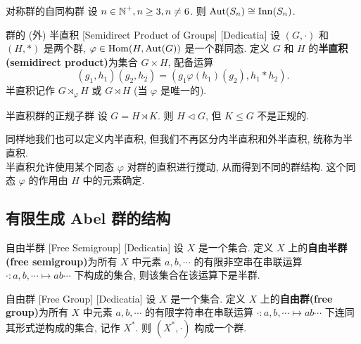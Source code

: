         \begin{ppt}
            {对称群的自同构群}
            设 \(n\in\operatorname{\mathbb{N}}^+, n\geq 3, n\neq 6\). 则 \(\operatorname{Aut}(S_n)\cong\operatorname{Inn}(S_n)\). 
        \end{ppt}

        \begin{dfn}
            {群的 (外) 半直积}
            [Semidirect Product of Groups]
            [Dedicatia]
            设 \((G,\cdot)\) 和 \((H,*)\) 是两个群, \(\varphi\in\operatorname{Hom}(H,\operatorname{Aut}(G))\) 是一个群同态. 定义 \(G\) 和 \(H\) 的\textbf{半直积(semidirect product)}为集合 \(G\times H\), 配备运算
            \[(g_1,h_1)(g_2,h_2)=(g_1\varphi(h_1)(g_2), h_1*h_2).\]
            半直积记作 \(G\rtimes_\varphi H\) 或 \(G\rtimes H\) (当 \(\varphi\) 是唯一的).
        \end{dfn}

        \begin{ppt}
            {半直积群的正规子群}
            设 \(G=H\rtimes K\). 则 \(H\lhd G\), 但 \(K\leq G\) 不是正规的.
        \end{ppt}

        \begin{rmk}
            [Dedicatia]
            同样地我们也可以定义内半直积, 但我们不再区分内半直积和外半直积, 统称为半直积.\\
            半直积允许使用某个同态 \(\varphi\) 对群的直积进行搅动, 从而得到不同的群结构. 这个同态 \(\varphi\) 的作用由 \(H\) 中的元素确定.
        \end{rmk}

    \subsection{有限生成 Abel 群的结构}

        \begin{dfn}
            {自由半群}
            [Free Semigroup]
            [Dedicatia]
            设 \(X\) 是一个集合. 定义 \(X\) 上的\textbf{自由半群(free semigroup)}为所有 \(X\) 中元素 \(a,b,\cdots\) 的有限非空串在串联运算 \(\cdot:a,b,\cdots\mapsto ab\cdots\) 下构成的集合, 则该集合在该运算下是半群. 
        \end{dfn}

        \begin{dfn}
            {自由群}
            [Free Group]
            [Dedicatia]
            设 \(X\) 是一个集合. 定义 \(X\) 上的\textbf{自由群(free group)}为所有 \(X\) 中元素 \(a,b,\cdots\) 的有限字符串在串联运算 \(\cdot:a,b,\cdots\mapsto ab\cdots\) 下连同其形式逆构成的集合, 记作 \(X^*\). 则 \((X^*, \cdot)\) 构成一个群.
        \end{dfn}


